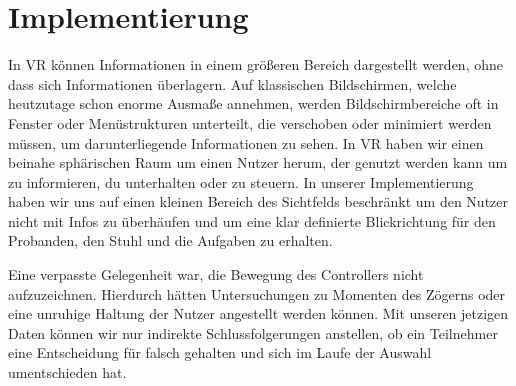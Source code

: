 \section{Implementierung}

In VR können Informationen in einem größeren Bereich dargestellt werden, ohne dass sich Informationen überlagern.
Auf klassischen Bildschirmen, welche heutzutage schon enorme Ausmaße annehmen, werden Bildschirmbereiche oft in Fenster oder Menüstrukturen unterteilt, die verschoben oder minimiert werden müssen, um darunterliegende Informationen zu sehen. 
In VR haben wir einen beinahe sphärischen Raum um einen Nutzer herum, der genutzt werden kann um zu informieren, du unterhalten oder zu steuern. 
In unserer Implementierung haben wir uns auf einen kleinen Bereich des Sichtfelds beschränkt um den Nutzer nicht mit Infos zu überhäufen und um eine klar definierte Blickrichtung für den Probanden, den Stuhl und die Aufgaben zu erhalten.

Eine verpasste Gelegenheit war, die Bewegung des Controllers nicht aufzuzeichnen. Hierdurch hätten Untersuchungen zu Momenten des Zögerns oder eine unruhige Haltung der Nutzer angestellt werden können. Mit unseren jetzigen Daten können wir nur indirekte Schlussfolgerungen anstellen, ob ein Teilnehmer eine Entscheidung für falsch gehalten und sich im Laufe der Auswahl umentschieden hat.
